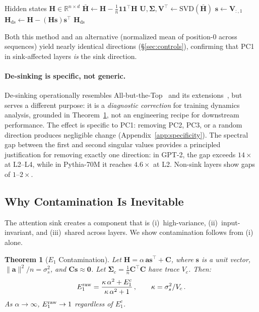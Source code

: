 \documentclass[11pt]{article}
\newtheorem{theorem}{Theorem}
\begin{document}
\begin{algorithm}[t]
\caption{De-sinking}\label{alg:desink}
\begin{algorithmic}[1]
\REQUIRE Hidden states $\mathbf{H} \in \mathbb{R}^{n \times d}$
\STATE $\bar{\mathbf{H}} \leftarrow \mathbf{H} - \frac{1}{n}\mathbf{1}\mathbf{1}^\top\mathbf{H}$ 
\STATE $\mathbf{U}, \mathbf{\Sigma}, \mathbf{V}^\top \leftarrow \text{SVD}(\bar{\mathbf{H}})$ 
\STATE $\mathbf{s} \leftarrow \mathbf{V}_{:,1}$ 
\STATE $\mathbf{H}_{\text{ds}} \leftarrow \mathbf{H} - (\mathbf{H}\mathbf{s})\mathbf{s}^\top$ 
\RETURN $\mathbf{H}_{\text{ds}}$
\end{algorithmic}
\end{algorithm}

Both this method and an alternative (normalized mean of position-0 across sequences) yield nearly identical directions (\S\ref{sec:controls}), confirming that PC1 in sink-affected layers \emph{is} the sink direction.

\paragraph{De-sinking is specific, not generic.}
De-sinking operationally resembles All-but-the-Top~\citep{mu2018allbutthetop} and its extensions~\citep{li2020bertflow,rajaee2021cluster}, but serves a different purpose: it is a \emph{diagnostic correction} for training dynamics analysis, grounded in Theorem~\ref{thm:e1}, not an engineering recipe for downstream performance.
The effect is specific to PC1: removing PC2, PC3, or a random direction produces negligible change (Appendix~\ref{app:specificity}).
The spectral gap between the first and second singular values provides a principled justification for removing exactly one direction: in GPT-2, the gap exceeds $14\times$ at L2--L4, while in Pythia-70M it reaches $4.6\times$ at L2.
Non-sink layers show gaps of $1$--$2\times$.

\subsection{Why Contamination Is Inevitable}\label{sec:theorem}

The attention sink creates a component that is (i)~high-variance, (ii)~input-invariant, and (iii)~shared across layers.
We show contamination follows from (i) alone.

\begin{theorem}[$E_1$ Contamination]\label{thm:e1}
Let $\mathbf{H} = \alpha\,\mathbf{a}\mathbf{s}^\top + \mathbf{C}$, where $\mathbf{s}$ is a unit vector, $\|\mathbf{a}\|^2/n = \sigma_s^2$, and $\mathbf{C}\mathbf{s} \approx \mathbf{0}$.
Let $\boldsymbol{\Sigma}_c = \frac{1}{n}\mathbf{C}^\top\mathbf{C}$ have trace $V_c$.
Then:
\begin{equation}\label{eq:e1}
    E_1^{\textup{raw}} = \frac{\kappa\,\alpha^2 + E_1^c}{\kappa\,\alpha^2 + 1}\,,
    \qquad \kappa = \sigma_s^2 / V_c\,.
\end{equation}
As $\alpha \to \infty$, $E_1^{\textup{raw}} \to 1$ regardless of $E_1^c$.
\end{theorem}
\end{document}
